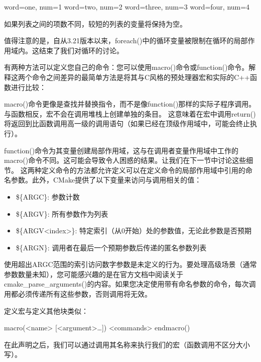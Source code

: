 \begin{shell}
word=one, num=1
word=two, num=2
word=three, num=3
word=four, num=4
\end{shell}

如果列表之间的项数不同，较短的列表的变量将保持为空。

值得注意的是，自从3.21版本以来，foreach()中的循环变量被限制在循环的局部作用域内。这结束了我们对循环的讨论。


有两种方法可以定义您自己的命令：您可以使用macro()命令或function()命令。解释这两个命令之间差异的最简单方法是将其与C风格的预处理器宏和实际的C++函数进行比较：

macro()命令更像是查找并替换指令，而不是像function()那样的实际子程序调用。与函数相反，宏不会在调用堆栈上创建单独的条目。 这意味着在宏中调用return()将返回到比函数调用高一级的调用语句（如果已经在顶级作用域中，可能会终止执行）。

function()命令为其变量创建局部作用域，这与在调用者变量作用域中工作的macro()命令不同。这可能会导致令人困惑的结果。让我们在下一节中讨论这些细节。
这两种定义命令的方法都允许定义可以在定义命令的局部作用域中引用的命名参数。此外，CMake提供了以下变量来访问与调用相关的值：

\begin{itemize}
\item
\$\{ARGC\}: 参数计数

\item
\$\{ARGV\}: 所有参数作为列表

\item
\$\{ARGV<index>\}: 特定索引（从0开始）处的参数值，无论此参数是否预期

\item
\$\{ARGN\}: 调用者在最后一个预期参数后传递的匿名参数列表
\end{itemize}

使用超出ARGC范围的索引访问数字参数是未定义的行为。要处理高级场景（通常参数数量未知），您可能感兴趣的是在官方文档中阅读关于cmake\_parse\_arguments()的内容。如果您决定使用带有命名参数的命令，每次调用都必须传递所有这些参数，否则调用将无效。


定义宏与定义其他块类似：

\begin{shell}
macro(<name> [<argument>…])
    <commands>
endmacro()
\end{shell}

在此声明之后，我们可以通过调用其名称来执行我们的宏（函数调用不区分大小写）。

